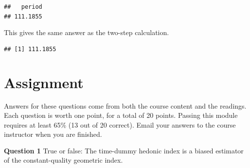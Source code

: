 \documentclass[]{article}
\newenvironment{Shaded}{\begin{snugshade}}{\end{snugshade}}
\newcommand{\CommentTok}[1]{\textcolor[rgb]{0.56,0.35,0.01}{\textit{#1}}}
\newcommand{\DataTypeTok}[1]{\textcolor[rgb]{0.13,0.29,0.53}{#1}}
\newcommand{\DecValTok}[1]{\textcolor[rgb]{0.00,0.00,0.81}{#1}}
\newcommand{\KeywordTok}[1]{\textcolor[rgb]{0.13,0.29,0.53}{\textbf{#1}}}
\newcommand{\NormalTok}[1]{#1}
\newcommand{\OperatorTok}[1]{\textcolor[rgb]{0.81,0.36,0.00}{\textbf{#1}}}
\newcommand{\StringTok}[1]{\textcolor[rgb]{0.31,0.60,0.02}{#1}}
\begin{document}
\begin{verbatim}
##   period 
## 111.1855
\end{verbatim}

This gives the same answer as the two-step calculation.

\begin{Shaded}
\end{Shaded}

\begin{verbatim}
## [1] 111.1855
\end{verbatim}

\hypertarget{assignment-2}{%
\section{Assignment}\label{assignment-2}}

Answers for these questions come from both the course content and the readings. Each question is worth one point, for a total of 20 points. Passing this module requires at least 65\% (13 out of 20 correct). Email your answers to the course instructor when you are finished.

\textbf{Question 1} True or false: The time-dummy hedonic index is a biased estimator of the constant-quality geometric index.
\end{document}
